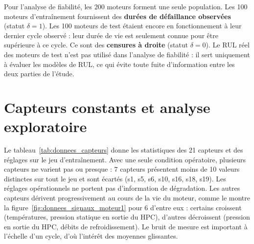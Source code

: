 Pour l'analyse de fiabilité, les 200 moteurs forment une seule population. Les 100 moteurs d'entraînement fournissent des \textbf{durées de défaillance observées} (statut $\delta = 1$). Les 100 moteurs de test étaient encore en fonctionnement à leur dernier cycle observé : leur durée de vie est seulement connue pour être supérieure à ce cycle. Ce sont des \textbf{censures à droite} (statut $\delta = 0$). Le RUL réel des moteurs de test n'est pas utilisé dans l'analyse de fiabilité : il sert uniquement à évaluer les modèles de RUL, ce qui évite toute fuite d'information entre les deux parties de l'étude.

\section{Capteurs constants et analyse exploratoire}\label{sec:donnees-capteurs}

Le tableau~\ref{tab:donnees_capteurs} donne les statistiques des 21 capteurs et des réglages sur le jeu d'entraînement. Avec une seule condition opératoire, plusieurs capteurs ne varient pas ou presque : 7 capteurs présentent moins de 10 valeurs distinctes sur tout le jeu et sont écartés (s1, s5, s6, s10, s16, s18, s19). Les réglages opérationnels ne portent pas d'information de dégradation. Les autres capteurs dérivent progressivement au cours de la vie du moteur, comme le montre la figure~\ref{fig:donnees_signaux_moteur1} pour 6 d'entre eux : certains croissent (températures, pression statique en sortie du HPC), d'autres décroissent (pression en sortie du HPC, débits de refroidissement). Le bruit de mesure est important à l'échelle d'un cycle, d'où l'intérêt des moyennes glissantes.

